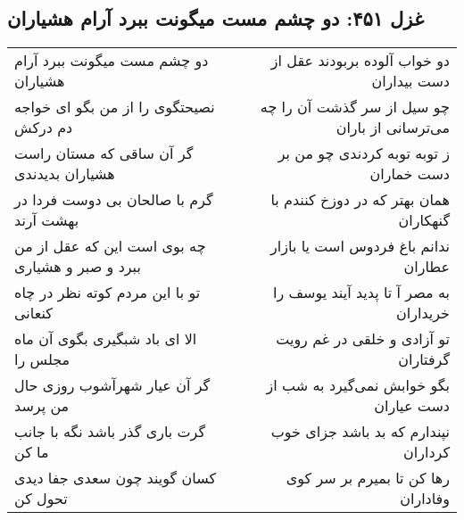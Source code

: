 \begin{center}
\section*{غزل ۴۵۱: دو چشم مست میگونت ببرد آرام هشیاران}
\label{sec:451}
\begin{longtable}{l p{0.5cm} r}
دو چشم مست میگونت ببرد آرام هشیاران
&&
دو خواب آلوده بربودند عقل از دست بیداران
\\
نصیحتگوی را از من بگو ای خواجه دم درکش
&&
چو سیل از سر گذشت آن را چه می‌ترسانی از باران
\\
گر آن ساقی که مستان راست هشیاران بدیدندی
&&
ز توبه توبه کردندی چو من بر دست خماران
\\
گرم با صالحان بی دوست فردا در بهشت آرند
&&
همان بهتر که در دوزخ کنندم با گنهکاران
\\
چه بوی است این که عقل از من ببرد و صبر و هشیاری
&&
ندانم باغ فردوس است یا بازار عطاران
\\
تو با این مردم کوته نظر در چاه کنعانی
&&
به مصر آ تا پدید آیند یوسف را خریداران
\\
الا ای باد شبگیری بگوی آن ماه مجلس را
&&
تو آزادی و خلقی در غم رویت گرفتاران
\\
گر آن عیار شهرآشوب روزی حال من پرسد
&&
بگو خوابش نمی‌گیرد به شب از دست عیاران
\\
گرت باری گذر باشد نگه با جانب ما کن
&&
نپندارم که بد باشد جزای خوب کرداران
\\
کسان گویند چون سعدی جفا دیدی تحول کن
&&
رها کن تا بمیرم بر سر کوی وفاداران
\\
\end{longtable}
\end{center}
